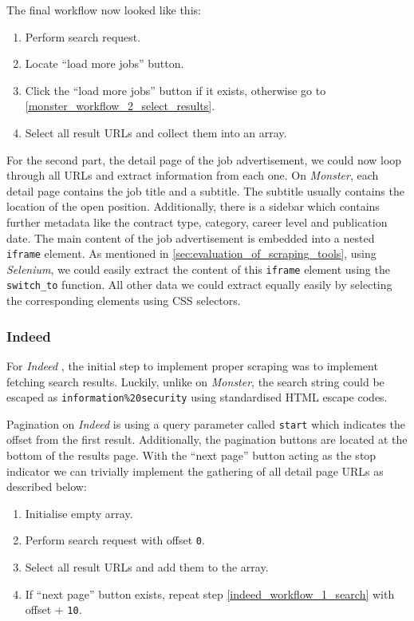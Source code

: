 \documentclass[runningheads]{llncs}
\begin{document}
The final workflow now looked like this:

\begin{enumerate}
  \item Perform search request.
  \item Locate “load more jobs” button.
  \item Click the “load more jobs” button if it exists, otherwise go to \ref{monster_workflow_2_select_results}.
  \item \label{monster_workflow_2_select_results}
    Select all result URLs and collect them into an array.
\end{enumerate}

For the second part, the detail page of the job advertisement, we could now loop through all URLs and extract information from each one. On \textit{Monster}, each detail page contains the job title and a subtitle. The subtitle usually contains the location of the open position. Additionally, there is a sidebar which contains further metadata like the contract type, category, career level and publication date. The main content of the job advertisement is embedded into a nested \texttt{iframe} element. As mentioned in \autoref{sec:evaluation_of_scraping_tools}, using \textit{Selenium}, we could easily extract the content of this \texttt{iframe} element using the \texttt{switch\_to} function. All other data we could extract equally easily by selecting the corresponding elements using CSS selectors.

\subsubsection{Indeed}
\label{subsub:indeed}

For \textit{Indeed} \cite{indeed}, the initial step to implement proper scraping was to implement fetching search results. Luckily, unlike on \textit{Monster}, the search string could be escaped as \texttt{information\%20security} using standardised HTML escape codes.

Pagination on \textit{Indeed} is using a query parameter called \texttt{start} which indicates the offset from the first result. Additionally, the pagination buttons are located at the bottom of the results page. With the “next page” button acting as the stop indicator we can trivially implement the gathering of all detail page URLs as described below:

\begin{enumerate}
  \item Initialise empty array.
  \item \label{indeed_workflow_1_search}
    Perform search request with offset \texttt{0}.
  \item Select all result URLs and add them to the array.
  \item If “next page” button exists, repeat step \ref{indeed_workflow_1_search} with offset + \texttt{10}.
\end{enumerate}
\end{document}
